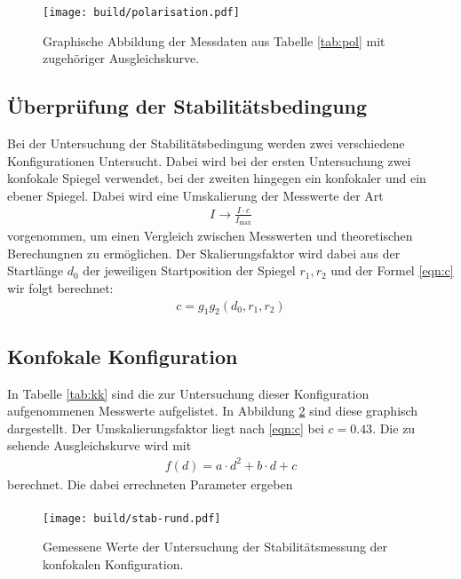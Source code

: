 \begin{figure}[htb]
  \centering
  \texttt{[image: build/polarisation.pdf]}
  \caption{Graphische Abbildung der Messdaten aus Tabelle \ref{tab:pol} mit zugehöriger Ausgleichskurve.}
  \label{plt:pol}
\end{figure}
\FloatBarrier


\FloatBarrier

\subsection{Überprüfung der Stabilitätsbedingung}
Bei der Untersuchung der Stabilitätsbedingung werden zwei verschiedene
Konfigurationen Untersucht. Dabei wird bei der ersten Untersuchung zwei
konfokale Spiegel verwendet, bei der zweiten hingegen ein konfokaler und
ein ebener Spiegel. Dabei wird eine Umskalierung der Messwerte der Art
\begin{align*}
  I \rightarrow \frac{I \cdot c}{I_\text{max}}
\end{align*}
vorgenommen, um einen Vergleich zwischen Messwerten und theoretischen
Berechungnen zu ermöglichen.
Der Skalierungsfaktor wird dabei aus der Startlänge $d_0$ der jeweiligen
Startposition der Spiegel $r_1, r_2$ und der Formel \ref{eqn:c} wir folgt
berechnet:
\begin{align*}
  c = g_1g_2(d_0,r_1,r_2)
  \label{eqn:c}
\end{align*}

\subsection{Konfokale Konfiguration}
In Tabelle \ref{tab:kk} sind die zur Untersuchung dieser Konfiguration
aufgenommenen Messwerte aufgelistet. In Abbildung \ref{plt:kk} sind diese
graphisch dargestellt. Der Umskalierungsfaktor liegt nach \eqref{eqn:c} bei
$c = \num{0,43}$. Die zu sehende Ausgleichskurve wird mit
\begin{align*}
  f(d) = a\cdot d^2 + b\cdot d + c
\end{align*}
berechnet. Die dabei errechneten Parameter ergeben
\begin{align*}
\end{align*}

\begin{figure}[htb]
  \centering
  \texttt{[image: build/stab-rund.pdf]}
  \caption{Gemessene Werte der Untersuchung der Stabilitätsmessung der konfokalen Konfiguration. }
  \label{plt:kk}
\end{figure}
\FloatBarrier

